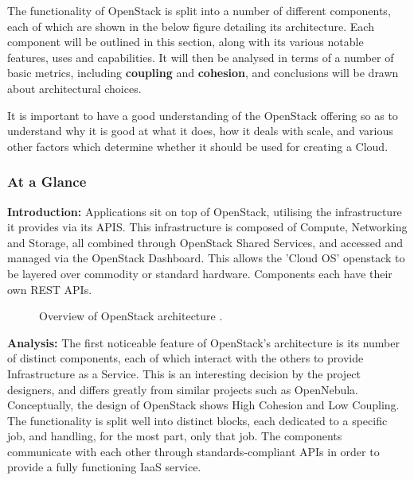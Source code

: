 The functionality of OpenStack is split into a number of different components, each of which are shown in the below figure detailing its architecture. Each component will be outlined in this section, along with its various notable features, uses and capabilities. It will then be analysed in terms of a number of basic metrics, including \textbf{coupling} and \textbf{cohesion}, and conclusions will be drawn about architectural choices. 

It is important to have a good understanding of the OpenStack offering so as to understand why it is good at what it does, how it deals with scale, and various other factors which determine whether it should be used for creating a Cloud.

\subsubsection{At a Glance}
\textbf{Introduction: }
Applications sit on top of OpenStack, utilising the infrastructure it provides via its APIS. This infrastructure is composed of Compute, Networking and Storage, all combined through OpenStack Shared Services, and accessed and managed via the OpenStack Dashboard. This allows the 'Cloud OS' openstack to be layered over commodity or standard hardware. Components each have their own REST APIs. 

\begin{figure}[H]
\centering
{}
\caption{Overview of OpenStack architecture \cite{openstacksoftware}.}
\end{figure}

\textbf{Analysis:}
The first noticeable feature of OpenStack's architecture is its number of distinct components, each of which interact with the others to provide Infrastructure as a Service. This is an interesting decision by the project designers, and differs greatly from similar projects such as OpenNebula. Conceptually, the design of OpenStack shows High Cohesion and Low Coupling. The functionality is split well into distinct blocks, each dedicated to a specific job, and handling, for the most part, only that job. The components communicate with each other through standards-compliant APIs in order to provide a fully functioning IaaS service. 

